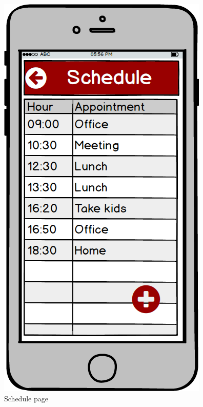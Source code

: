 \begin{figure}[!htb]
\begin{minipage}[b]{0.3\textwidth}
	\centering
	\includegraphics[scale=0.3]{images/Schedule}
	\caption{Schedule page}
	\label{ref:schedule}
\end{minipage}
\hfill
\begin{minipage}[b]{0.3\textwidth}
	\centering

\end{minipage}
\end{figure}
